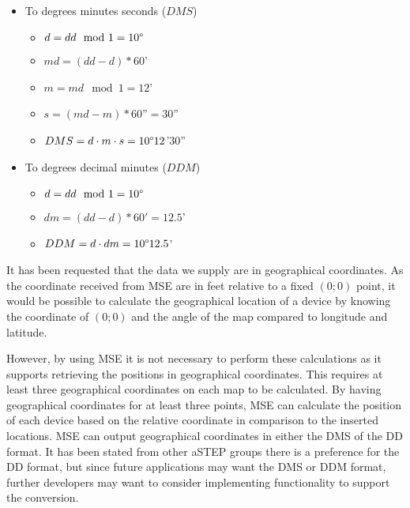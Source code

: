 \begin{itemize}
\begin{itemize}
		\item To degrees minutes seconds ($DMS$)
		\begin{itemize}
			\setlength\itemsep{0.00005em}
			\item $ d = dd \mod 1 = 10\degree $
			\item $ md = (dd - d) * 60$' 
			\item $ m = md \mod 1 = 12$' 
			\item $ s = (md - m) * 60$''$ = 30$''
			\item $ DMS = d \cdot m \cdot s = 10\degree 12$'$ 30$'' 
		\end{itemize}
		\item To degrees decimal minutes ($DDM$)
		\begin{itemize}
			\setlength\itemsep{0.00005em}
			\item $ d = dd \mod 1 = 10\degree $
			\item $ dm = (dd - d) * 60' = 12.5$'
			\item $ DDM = d \cdot dm = 10\degree 12.5$'
		\end{itemize}
	\end{itemize}
\end{itemize}

It has been requested that the data we supply are in geographical coordinates.
As the coordinate received from MSE are in feet relative to a fixed $(0;0)$ point, it would be possible to calculate the geographical location of a device by knowing the coordinate of $(0;0)$ and the angle of the map compared to longitude and latitude. 

However, by using MSE it is not necessary to perform these calculations as it supports retrieving the positions in geographical coordinates. This requires at least three geographical coordinates on each map to be calculated. By having geographical coordinates for at least three points, MSE can calculate the position of each device based on the relative coordinate in comparison to the inserted locations\cite{geo_cisco}. 
MSE can output geographical coordinates in either the DMS of the DD format\cite{cisco_geo_type}. It has been stated from other aSTEP groups there is a preference for the DD format, but since future applications may want the DMS or DDM format, further developers may want to consider implementing functionality to support the conversion. 